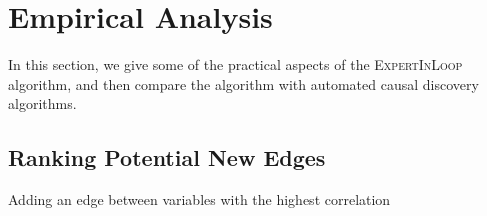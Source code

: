 \documentclass{uai2025} %
\begin{document}

\section{Empirical Analysis}
\label{sec:empirical}

In this section, we give some of the practical aspects of the
\textsc{ExpertInLoop} algorithm, and then compare the algorithm with automated
causal discovery algorithms.

\subsection{Ranking Potential New Edges}
\label{sec:ranking}


\begin{algorithm}[h]
\DontPrintSemicolon
\SetAlgoLined
{}
\caption{Adding an edge between variables with the highest correlation}
\label{algo:ranked_expand}
\end{algorithm}
\end{document}

